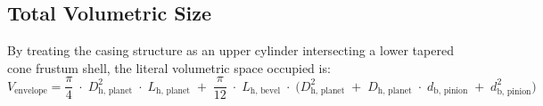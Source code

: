 \newpage
    \subsection{Total Volumetric Size}
        By treating the casing structure as an upper cylinder intersecting a lower tapered cone 
        frustum shell, the literal volumetric space occupied is:
            \begin{equation}
            \label{eq:totalvolumetricsize}
            V_{\text{envelope}}
            =
            \frac{\pi}{4}\;\cdot\;D_{\text{h, planet}}^{2}\;\cdot\;L_{\text{h, planet}}
            \;+\;
            \frac{\pi}{12}\;\cdot\;L_{\text{h, bevel}}\;\cdot\;
                \bigl(
                    D_{\text{h, planet}}^{2}
                    \;+\;
                    D_{\text{h, planet}}\;\cdot\;d_{\text{b, pinion}}
                    \;+\;
                    d_{\text{b, pinion}}^{2}
                \bigr)
            \end{equation}
